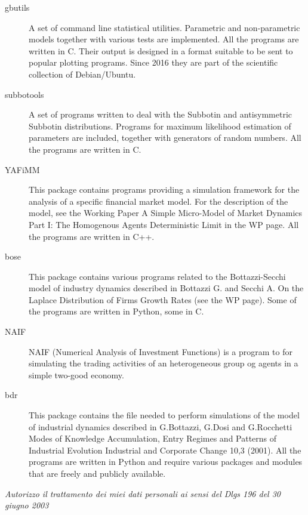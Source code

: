 \documentclass[a4paper]{article}
\begin{document}
\begin{description}
\item[{gbutils}] 
A set of command line statistical utilities. Parametric and
non-parametric models together with various tests are
implemented. All the programs are written in C. Their output is
designed in a format suitable to be sent to popular plotting
programs. Since 2016 they are part of the scientific collection of
Debian/Ubuntu.

\item[{subbotools}] 
A set of programs written to deal with the Subbotin and antisymmetric
Subbotin distributions. Programs for maximum likelihood estimation of
parameters are included, together with generators of random
numbers. All the programs are written in C.

\item[{YAFiMM}] 
This package contains programs providing a simulation framework for
the analysis of a specific financial market model. For the
description of the model, see the Working Paper A Simple Micro-Model
of Market Dynamics Part I: The \textquotedbl{}Homogenous Agents\textquotedbl{} Deterministic
Limit in the WP page. All the programs are written in C++.

\item[{bose}] 
This package contains various programs related to the Bottazzi-Secchi
model of industry dynamics described in Bottazzi G. and Secchi A. On
the Laplace Distribution of Firms Growth Rates (see the WP
page). Some of the programs are written in Python, some in C.

\item[{NAIF}] 
NAIF (Numerical Analysis of Investment Functions) is a program to for
simulating the trading activities of an heterogeneous group og agents
in a simple two-good economy.

\item[{bdr}] 
This package contains the file needed to perform simulations of the
model of industrial dynamics described in G.Bottazzi, G.Dosi and
G.Rocchetti Modes of Knowledge Accumulation, Entry Regimes and
Patterns of Industrial Evolution Industrial and Corporate Change 10,3
(2001). All the programs are written in Python and require various
packages and modules that are freely and publicly available.

\end{description}

\emph{Autorizzo il trattamento dei miei dati personali ai sensi del Dlgs 196 del 30 giugno 2003}
\end{document}
